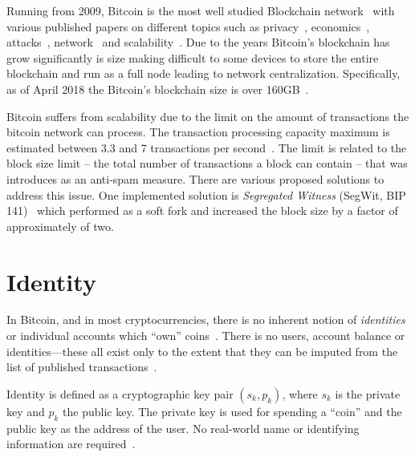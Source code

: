 Running from 2009, Bitcoin is the most well studied Blockchain network~\cite{10.1007/978-3-662-46803-6_10} with various published papers on different topics such as privacy~\cite{10.1007/978-3-319-70278-0_8, 10.1007/978-3-642-39884-1_2, Bonneau14e.w.:mixcoin, 10.1007/978-3-662-44774-1_9}, economics~\cite{Babaioff:2012:BRB:2229012.2229022, 10.1007/978-3-319-70278-0_17, Bentov2017DecentralizedPM, Carlsten:2016:IBW:2976749.2978408}, attacks~\cite{DBLP:journals_corr_Bahack13, DBLP:journals_corr_EyalS13}, network~\cite{10.1007/978-3-662-44774-1_7, 190890} and scalability~\cite{kiayias2017non, 10.1007/978-3-662-53357-4_5, 10.1007/978-3-662-53357-4_8}. Due to the years Bitcoin's blockchain has grow significantly is size making difficult to some devices to store the entire blockchain and run as a full node leading to network centralization. Specifically, as of April 2018 the Bitcoin's blockchain size is over 160GB~\cite{btc_bl_size}.

Bitcoin suffers from scalability due to the limit on the amount of transactions the bitcoin network can process. The transaction processing capacity maximum is estimated between 3.3 and 7 transactions per second~\cite{10.1007/978-3-662-53357-4_8}. The limit is related to the block size limit -- the total number of transactions a block can contain -- that was introduces as an anti-spam measure. There are various proposed solutions to address this issue. One implemented solution is \textit{Segregated Witness} (SegWit, BIP 141)~\cite{segwit} which performed as a soft fork and increased the block size by a factor of approximately of two.

\section{Identity}\label{blockchain:identity}

In Bitcoin, and in most cryptocurrencies, there is no inherent notion of \textit{identities} or individual accounts which ``own'' coins~\cite{7163021,nakamoto2012bitcoin}. There is no users, account balance or identities—these all exist only to the extent that they can be imputed from the list of published transactions~\cite{7163021,nakamoto2012bitcoin}.

Identity is defined as a cryptographic key pair $(s_k, p_k)$, where $s_k$ is the private key and $p_k$ the public key. The private key is used for spending a ``coin'' and the public key as the address of the user. No real-world name or identifying information are required~\cite{7163021,nakamoto2012bitcoin}.

